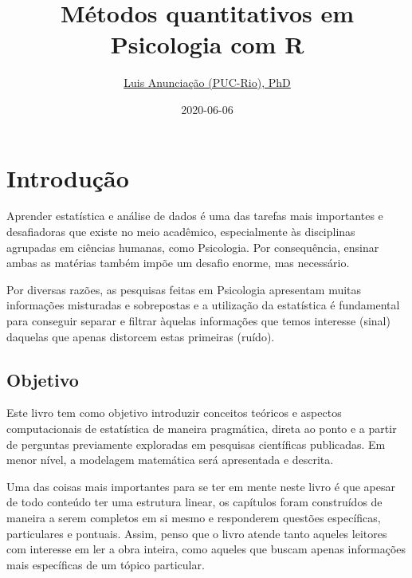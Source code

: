 \documentclass[
]{book}
\title{Métodos quantitativos em Psicologia com R}
\author{\href{mailto:\%20luisfca@gmail.com}{Luis Anunciação (PUC-Rio), PhD}}
\date{2020-06-06}
\newenvironment{Shaded}{\begin{snugshade}}{\end{snugshade}}
\newcommand{\DataTypeTok}[1]{\textcolor[rgb]{0.13,0.29,0.53}{#1}}
\newcommand{\KeywordTok}[1]{\textcolor[rgb]{0.13,0.29,0.53}{\textbf{#1}}}
\newcommand{\NormalTok}[1]{#1}
\newcommand{\OperatorTok}[1]{\textcolor[rgb]{0.81,0.36,0.00}{\textbf{#1}}}
\newcommand{\OtherTok}[1]{\textcolor[rgb]{0.56,0.35,0.01}{#1}}
\newcommand{\StringTok}[1]{\textcolor[rgb]{0.31,0.60,0.02}{#1}}
\begin{document}
\maketitle

{
\hypersetup{linkcolor=}
\setcounter{tocdepth}{1}
\tableofcontents
}
\begin{Shaded}
\end{Shaded}

\hypertarget{introduuxe7uxe3o}{%
\chapter{Introdução}\label{introduuxe7uxe3o}}

Aprender estatística e análise de dados é uma das tarefas mais importantes e desafiadoras que existe no meio acadêmico, especialmente às disciplinas agrupadas em ciências humanas, como Psicologia. Por consequência, ensinar ambas as matérias também impõe um desafio enorme, mas necessário.

Por diversas razões, as pesquisas feitas em Psicologia apresentam muitas informações misturadas e sobrepostas e a utilização da estatística é fundamental para conseguir separar e filtrar àquelas informações que temos interesse (sinal) daquelas que apenas distorcem estas primeiras (ruído).

\hypertarget{objetivo}{%
\section{Objetivo}\label{objetivo}}

Este livro tem como objetivo introduzir conceitos teóricos e aspectos computacionais de estatística de maneira pragmática, direta ao ponto e a partir de perguntas previamente exploradas em pesquisas científicas publicadas. Em menor nível, a modelagem matemática será apresentada e descrita.

Uma das coisas mais importantes para se ter em mente neste livro é que apesar de todo conteúdo ter uma estrutura linear, os capítulos foram construídos de maneira a serem completos em si mesmo e responderem questões específicas, particulares e pontuais. Assim, penso que o livro atende tanto aqueles leitores com interesse em ler a obra inteira, como aqueles que buscam apenas informações mais específicas de um tópico particular.
\end{document}
